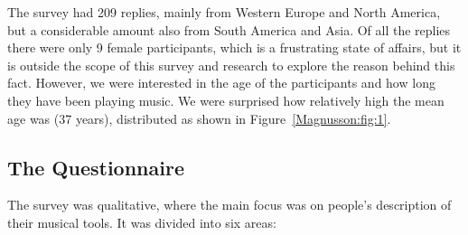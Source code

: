 The survey had 209 replies, mainly from Western Europe and North America, but a
considerable amount also from South America and Asia. Of all the replies there
were only 9 female participants, which is a frustrating state of affairs, but it
is outside the scope of this survey and research to explore the reason behind
this fact. However, we were interested in the age of the participants and how
long they have been playing music. We were surprised how relatively high the mean
age was (37 years), distributed as shown in Figure~\ref{Magnusson:fig:1}.

\subsection{The Questionnaire}

The survey was qualitative, where the main focus was on people's description of
their musical tools. It was divided into six areas:

